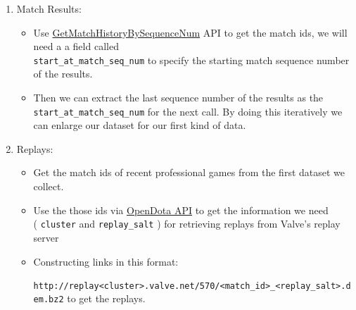 \documentclass{article}
\newcommand{\codeinline}[1]{
	\texttt{#1}
}
\begin{document}
\begin{enumerate}
\item Match Results:
	\begin{itemize}
		\item Use \href{https://wiki.teamfortress.com/wiki/WebAPI/GetMatchHistoryBySequenceNum}{GetMatchHistoryBySequenceNum} API to get the match ids, we will need a a field called \\ \codeinline{start_at_match_seq_num} to specify the starting match sequence number of the results. 
		\item Then  we can extract the last sequence number of the results as the \codeinline{start_at_match_seq_num} for the next call. By doing this iteratively we can enlarge our dataset for our first kind of data.
	\end{itemize}
\item Replays:
	\begin{itemize}
		\item Get the match ids of recent professional games from the first dataset we collect.
		\item Use the those ids via \href{https://docs.opendota.com/#tag/matches}{OpenDota API} to get the information we need \\ (\codeinline{cluster} and \codeinline{replay_salt}) for retrieving replays from Valve's replay server
		\item Constructing links in this format:\\  \codeinline{ http://replay<cluster>.valve.net/570/<match_id>_<replay_salt>.dem.bz2} to get the replays.
	\end{itemize}

\end{enumerate}
\end{document}
